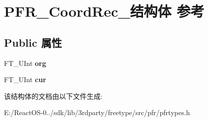 \hypertarget{struct_p_f_r___coord_rec__}{}\section{P\+F\+R\+\_\+\+Coord\+Rec\+\_\+结构体 参考}
\label{struct_p_f_r___coord_rec__}
\subsection*{Public 属性}
\begin{DoxyCompactItemize}
\item 
\mbox{\label{struct_p_f_r___coord_rec___a363bd9399270097988c712a7a826130b}} 
F\+T\+\_\+\+U\+Int {\bfseries org}
\item 
\mbox{\label{struct_p_f_r___coord_rec___a3c7cb005ccd141e1d7cb64aef6b95b9a}} 
F\+T\+\_\+\+U\+Int {\bfseries cur}
\end{DoxyCompactItemize}


该结构体的文档由以下文件生成\+:\begin{DoxyCompactItemize}
\item 
E\+:/\+React\+O\+S-\/0../sdk/lib/3rdparty/freetype/src/pfr/pfrtypes.\+h\end{DoxyCompactItemize}
